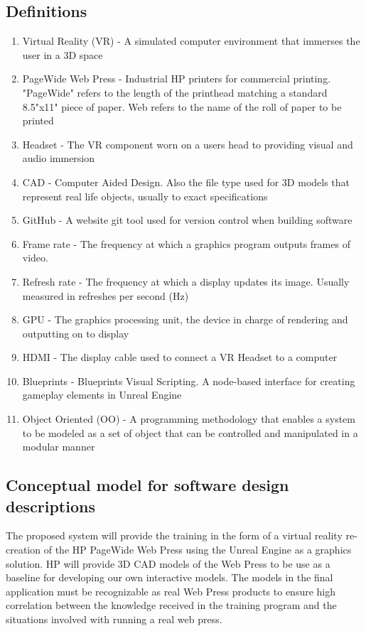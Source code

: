 \documentclass[onecolumn, draftclsnofoot,10pt, compsoc]{IEEEtran}
\begin{document}
\subsection{Definitions}
\begin{enumerate}
    \item Virtual Reality (VR) - A simulated computer environment that immerses the user in a 3D space
    \item PageWide Web Press - Industrial HP printers for commercial printing. "PageWide" refers to the length of the printhead matching a standard 8.5"x11" piece of paper. Web refers to the name of the roll of paper to be printed
    \item Headset - The VR component worn on a users head to providing visual and audio immersion
    \item CAD - Computer Aided Design. Also the file type used for 3D models that represent real life objects, usually to exact specifications
    \item GitHub - A website git tool used for version control when building software
    \item Frame rate - The frequency at which a graphics program outputs frames of video.
    \item Refresh rate - The frequency at which a display updates its image. Usually measured in refreshes per second (Hz)
    \item GPU - The graphics processing unit, the device in charge of rendering and outputting on to display
    \item HDMI - The display cable used to connect a VR Headset to a computer
    \item Blueprints - Blueprints Visual Scripting. A node-based interface for creating gameplay elements in Unreal Engine
    \item Object Oriented (OO) - A programming methodology that enables a system to be modeled as a set of object that can be controlled and manipulated in a modular manner
    
\end{enumerate}
\subsection{Conceptual model for software design descriptions}
The proposed system will provide the training in the form of a virtual reality re-creation of the HP PageWide Web Press using the Unreal Engine as a graphics solution. HP will provide 3D CAD models of the Web Press to be use as a baseline for developing our own interactive models. The models in the final application must be recognizable as real Web Press products to ensure high correlation between the knowledge received in the training program and the situations involved with running a real web press.
\end{document}
